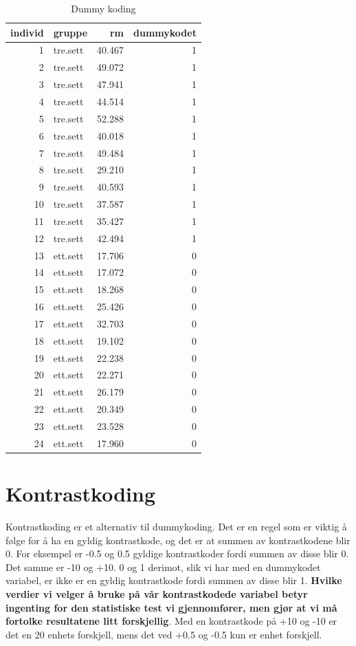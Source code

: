 \documentclass[
]{book}
\begin{document}
\begin{table}

\caption{\label{tab:unnamed-chunk-4}Dummy koding}
\centering
\begin{tabular}[t]{r|l|r|r}
\hline
individ & gruppe & rm & dummykodet\\
\hline
1 & tre.sett & 40.467 & 1\\
\hline
2 & tre.sett & 49.072 & 1\\
\hline
3 & tre.sett & 47.941 & 1\\
\hline
4 & tre.sett & 44.514 & 1\\
\hline
5 & tre.sett & 52.288 & 1\\
\hline
6 & tre.sett & 40.018 & 1\\
\hline
7 & tre.sett & 49.484 & 1\\
\hline
8 & tre.sett & 29.210 & 1\\
\hline
9 & tre.sett & 40.593 & 1\\
\hline
10 & tre.sett & 37.587 & 1\\
\hline
11 & tre.sett & 35.427 & 1\\
\hline
12 & tre.sett & 42.494 & 1\\
\hline
13 & ett.sett & 17.706 & 0\\
\hline
14 & ett.sett & 17.072 & 0\\
\hline
15 & ett.sett & 18.268 & 0\\
\hline
16 & ett.sett & 25.426 & 0\\
\hline
17 & ett.sett & 32.703 & 0\\
\hline
18 & ett.sett & 19.102 & 0\\
\hline
19 & ett.sett & 22.238 & 0\\
\hline
20 & ett.sett & 22.271 & 0\\
\hline
21 & ett.sett & 26.179 & 0\\
\hline
22 & ett.sett & 20.349 & 0\\
\hline
23 & ett.sett & 23.528 & 0\\
\hline
24 & ett.sett & 17.960 & 0\\
\hline
\end{tabular}
\end{table}

\hypertarget{kontrastkoding}{%
\section{Kontrastkoding}\label{kontrastkoding}}

Kontrastkoding er et alternativ til dummykoding. Det er en regel som er viktig å følge for å ha en gyldig kontrastkode, og det er at summen av kontrastkodene blir 0. For eksempel er -0.5 og 0.5 gyldige kontrastkoder fordi summen av disse blir 0. Det samme er -10 og +10. 0 og 1 derimot, slik vi har med en dummykodet variabel, er ikke er en gyldig kontrastkode fordi summen av disse blir 1. \textbf{Hvilke verdier vi velger å bruke på vår kontrastkodede variabel betyr ingenting for den statistiske test vi gjennomfører, men gjør at vi må fortolke resultatene litt forskjellig}. Med en kontrastkode på +10 og -10 er det en 20 enhets forskjell, mens det ved +0.5 og -0.5 kun er enhet forskjell.
\end{document}
